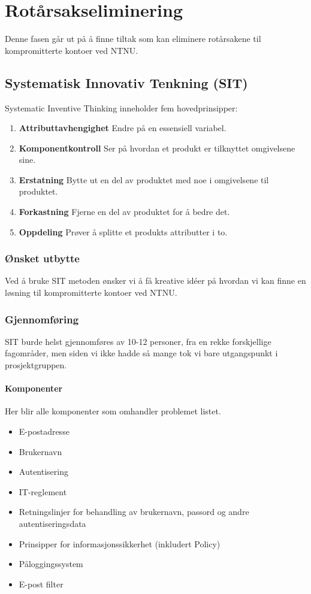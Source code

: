 \chapter{Rotårsakseliminering}
Denne fasen går ut på å finne tiltak som kan eliminere rotårsakene til kompromitterte kontoer ved NTNU. 

\section{Systematisk Innovativ Tenkning (SIT)}
Systematic Inventive Thinking inneholder fem hovedprinsipper:

\begin{enumerate}
    \item \textbf{Attributtavhengighet} Endre på en essensiell variabel.
    \item \textbf{Komponentkontroll} Ser på hvordan et produkt er tilknyttet omgivelsene sine.
    \item \textbf{Erstatning} Bytte ut en del av produktet med noe i omgivelsene til produktet.
    \item \textbf{Forkastning} Fjerne en del av produktet for å bedre det.
    \item \textbf{Oppdeling} Prøver å splitte et produkts attributter i to.
\end{enumerate}

\subsection{Ønsket utbytte}
Ved å bruke SIT metoden ønsker vi å få kreative idéer på hvordan vi kan finne en løsning til kompromitterte kontoer ved NTNU. 

\subsection{Gjennomføring}
SIT burde helst gjennomføres av 10-12 personer, fra en rekke forskjellige fagområder, men siden vi ikke hadde så mange tok vi bare utgangspunkt i prosjektgruppen. 
\subsubsection{Komponenter} 
Her blir alle komponenter som omhandler problemet listet.

\begin{itemize}
    \item E-postadresse
    \item Brukernavn
    \item Autentisering
    \item IT-reglement
    \item Retningslinjer for behandling av brukernavn, passord og andre autentiseringsdata
    \item Prinsipper for informasjonssikkerhet (inkludert Policy)
    \item Påloggingssystem
    \item E-post filter
\end{itemize}

